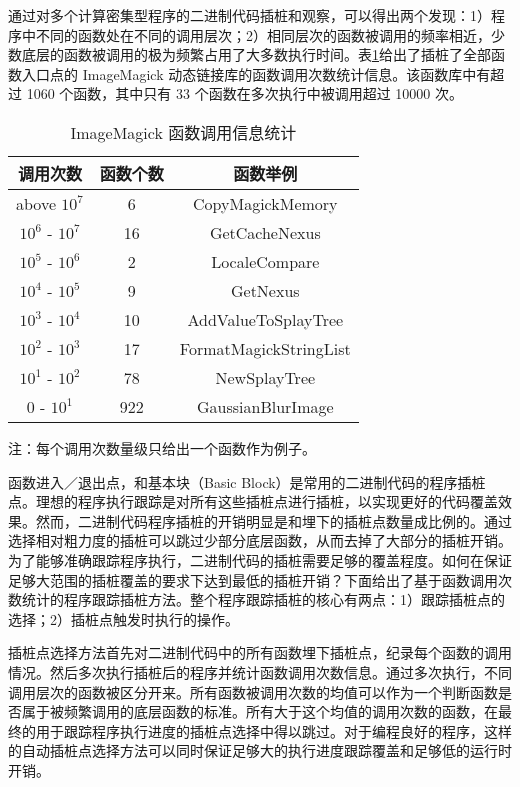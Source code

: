 通过对多个计算密集型程序的二进制代码插桩和观察，可以得出两个发现：1）程序中不同的函数处在不同的调用层次；2）相同层次的函数被调用的频率相近，少数底层的函数被调用的极为频繁占用了大多数执行时间。表\ref{table:inst-stats}给出了插桩了全部函数入口点的 ImageMagick 动态链接库的函数调用次数统计信息。该函数库中有超过 1060 个函数，其中只有 33 个函数在多次执行中被调用超过 10000 次。
\begin{table}
\centering
\begin{threeparttable}
\caption{ImageMagick 函数调用信息统计}
\label{table:inst-stats}
\begin{tabular}{c|c|c}
\hline
调用次数 & 函数个数 & 函数举例 \\
\hline
above $10^7$ & 6 & CopyMagickMemory \\
$10^6$ - $10^7$ & 16 & GetCacheNexus \\
$10^5$ - $10^6$ & 2 & LocaleCompare \\
$10^4$ - $10^5$ & 9 & GetNexus \\
$10^3$ - $10^4$ & 10 & AddValueToSplayTree \\
$10^2$ - $10^3$ & 17 & FormatMagickStringList \\
$10^1$ - $10^2$ & 78 & NewSplayTree \\
$0$    - $10^1$ & 922 & GaussianBlurImage \\
\hline
\end{tabular}
\small 注：每个调用次数量级只给出一个函数作为例子。 
\end{threeparttable}
\end{table}

函数进入／退出点，和基本块（Basic Block）是常用的二进制代码的程序插桩点。理想的程序执行跟踪是对所有这些插桩点进行插桩，以实现更好的代码覆盖效果。然而，二进制代码程序插桩的开销明显是和埋下的插桩点数量成比例的。通过选择相对粗力度的插桩可以跳过少部分底层函数，从而去掉了大部分的插桩开销。为了能够准确跟踪程序执行，二进制代码的插桩需要足够的覆盖程度。如何在保证足够大范围的插桩覆盖的要求下达到最低的插桩开销？下面给出了基于函数调用次数统计的程序跟踪插桩方法。整个程序跟踪插桩的核心有两点：1）跟踪插桩点的选择；2）插桩点触发时执行的操作。

插桩点选择方法首先对二进制代码中的所有函数埋下插桩点，纪录每个函数的调用情况。然后多次执行插桩后的程序并统计函数调用次数信息。通过多次执行，不同调用层次的函数被区分开来。所有函数被调用次数的均值可以作为一个判断函数是否属于被频繁调用的底层函数的标准。所有大于这个均值的调用次数的函数，在最终的用于跟踪程序执行进度的插桩点选择中得以跳过。对于编程良好的程序，这样的自动插桩点选择方法可以同时保证足够大的执行进度跟踪覆盖和足够低的运行时开销。

